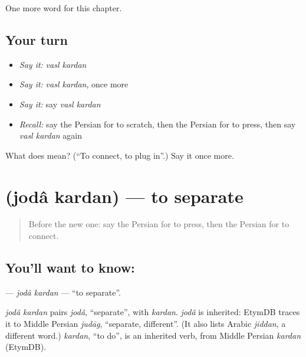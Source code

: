 \begin{grammarlens}[title={What you've built}]
One more word for this chapter.
\end{grammarlens}

\subsection*{Your turn}
\begin{itemize}
\raggedright
  \item \emph{Say it:} \emph{vasl kardan}
  \item \emph{Say it:} \emph{vasl kardan}, once more
  \item \emph{Say it:} say \emph{vasl kardan}
  \item \emph{Recall:} say the Persian for to scratch, then the Persian for to press, then say \emph{vasl kardan} again
\end{itemize}

\begin{tcolorbox}[breakable,colback=teal!4,colframe=teal!35!black,title={Before you move on}]
What does   mean? (\textquotedblleft{}To connect, to plug in\textquotedblright{}.) Say it once more.
\end{tcolorbox}
\section[\texorpdfstring{\fa{جدا} \fa{کردن} (jodâ kardan)}{جدا کردن (jodâ kardan)}]{  (jodâ kardan) — to separate}

\label{lesson:FA-C224-joda-kardan}



\begin{quote}
Before the new one: say the Persian for to press, then the Persian for to connect.
\end{quote}

\subsection*{You'll want to know:  }
\textbf{ } — \emph{jodâ kardan} — \textquotedblleft{}to separate\textquotedblright{}.

\begin{cousinweb}
\emph{jodâ kardan} pairs \emph{jodâ}, \textquotedblleft{}separate\textquotedblright{}, with \emph{kardan}. \emph{jodâ} is inherited: EtymDB traces it to Middle Persian \emph{judāg}, \textquotedblleft{}separate, different\textquotedblright{}. (It also lists Arabic \emph{jiddan}, a different word.) \emph{kardan}, \textquotedblleft{}to do\textquotedblright{}, is an inherited verb, from Middle Persian \emph{kardan} (EtymDB).
\end{cousinweb}

